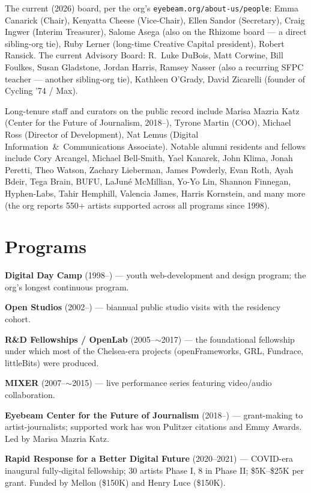\documentclass[10pt,letterpaper,twocolumn]{article}
\begin{document}
The current (2026) board, per the org's \texttt{eyebeam.org/about-us/people}: Emma Canarick (Chair), Kenyatta Cheese (Vice-Chair), Ellen Sandor (Secretary), Craig Ingwer (Interim Treasurer), Salome Asega (also on the Rhizome board --- a direct sibling-org tie), Ruby Lerner (long-time Creative Capital president), Robert Ransick. The current Advisory Board: R.~Luke DuBois, Matt Corwine, Bill Foulkes, Susan Gladstone, Jordan Harris, Ramsey Nasser (also a recurring SFPC teacher --- another sibling-org tie), Kathleen O'Grady, David Zicarelli (founder of Cycling '74 / Max).

Long-tenure staff and curators on the public record include Marisa Mazria Katz (Center for the Future of Journalism, 2018--), Tyrone Martin (COO), Michael Ross (Director of Development), Nat Lemus (Digital Information~\&~Communications Associate). Notable alumni residents and fellows include Cory Arcangel, Michael Bell-Smith, Yael Kanarek, John Klima, Jonah Peretti, Theo Watson, Zachary Lieberman, James Powderly, Evan Roth, Ayah Bdeir, Tega Brain, BUFU, LaJun\'{e} McMillian, Yo-Yo Lin, Shannon Finnegan, Hyphen-Labs, Tahir Hemphill, Valencia James, Harris Kornstein, and many more (the org reports 550+ artists supported across all programs since 1998).

\section{Programs}

\textbf{Digital Day Camp} (1998--) --- youth web-development and design program; the org's longest continuous program.

\textbf{Open Studios} (2002--) --- biannual public studio visits with the residency cohort.

\textbf{R\&D Fellowships / OpenLab} (2005--$\sim$2017) --- the foundational fellowship under which most of the Chelsea-era projects (openFrameworks, GRL, Fundrace, littleBits) were produced.

\textbf{MIXER} (2007--$\sim$2015) --- live performance series featuring video/audio collaboration.

\textbf{Eyebeam Center for the Future of Journalism} (2018--) --- grant-making to artist-journalists; supported work has won Pulitzer citations and Emmy Awards. Led by Marisa Mazria Katz.

\textbf{Rapid Response for a Better Digital Future} (2020--2021) --- COVID-era inaugural fully-digital fellowship; 30 artists Phase I, 8 in Phase II; \$5K--\$25K per grant. Funded by Mellon (\$150K) and Henry Luce (\$150K).
\end{document}
